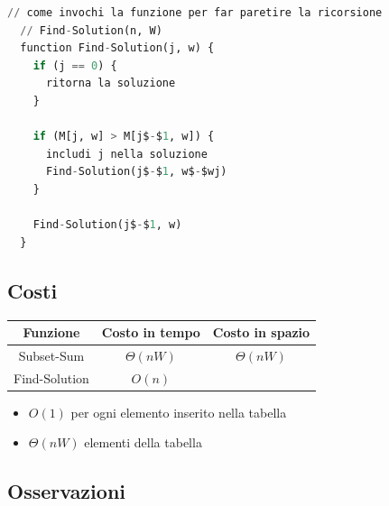 \begin{lstlisting}[language=Python, mathescape=true]
  // come invochi la funzione per far paretire la ricorsione
  // Find-Solution(n, W)
  function Find-Solution(j, w) {
    if (j == 0) {
      ritorna la soluzione
    }
  
    if (M[j, w] > M[j$-$1, w]) {
      includi j nella soluzione 
      Find-Solution(j$-$1, w$-$wj)
    }
  
    Find-Solution(j$-$1, w)
  }
\end{lstlisting}

\subsection{Costi}

\begin{center}
  \begin{tabular}{ |c|c|c| }
    \hline
    \textbf{Funzione} & \textbf{Costo in tempo} & \textbf{Costo in spazio} \\
    \hline
    Subset-Sum        & $\Theta(nW)$            & $\Theta(nW)$             \\
    \hline
    Find-Solution     & $O(n)$                  &                          \\
    \hline
  \end{tabular}
\end{center}

\begin{itemize}

  \item
        $O(1)$ per ogni elemento inserito nella tabella
  \item
        $\Theta(nW)$ elementi della tabella
\end{itemize}


\subsection{Osservazioni}

